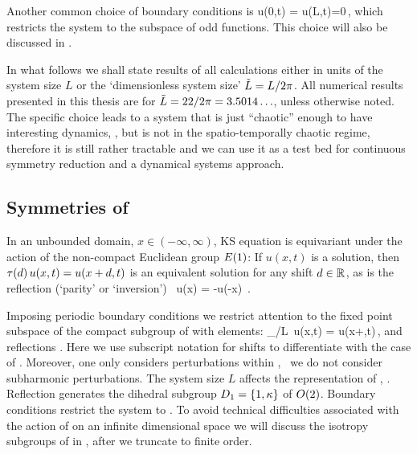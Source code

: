 Another common choice of boundary conditions is
\beq
  u(0,t) = u(L,t)=0\,,
 \label{eq:KSodd}
\eeq
which restricts the system to the subspace of odd functions. This choice will also be discussed
in .

In what follows
we shall state results of all calculations either in units of the system size $L$
or the `dimensionless system size' $\tilde{L}=L/2\pi$.
All numerical results presented in this thesis
are for $\tilde{L}=22/2\pi = 3.5014\ldots$, unless otherwise
noted. The specific choice leads to a system that is just ``chaotic'' enough
to have interesting dynamics, \cf {}, but is not in the spatio-temporally chaotic
regime, therefore it is still rather tractable and we can use it as a test bed for
continuous symmetry reduction and a dynamical systems approach.


\subsection{Symmetries of \KSe}
\label{sec:KSeSymm}

In an unbounded domain, $x\in(-\infty,\infty)$, KS equation is equivariant
under the action of the non-compact Euclidean group $E(1)$:
If $u(x,t)$ is a solution, then
$\tau({d})\, u(x,t) = u(x+d,t)$
is an equivalent solution for any shift
$d\in\mathbb{R}^{}$, as is the reflection (`parity' or `inversion')
\beq
    \Refl \, u(x) = -u(-x)
\,.

Imposing periodic boundary conditions we restrict attention to the fixed
point subspace of the compact subgroup  of  with elements:
\beq
	\Shift_{\shift/L}\, u(x,t) = u(x+\shift,t)\,,\qquad \shift\in\left[-L/2,L/2\right]	
\eeq
and reflections . Here we use subscript
notation for shifts to differentiate with the case of .
Moreover, one only considers perturbations within ,
\ie\ we do not consider subharmonic perturbations. The system
size $L$ affects the representation of , \cf
{}.  Reflection
generates the dihedral subgroup $D_{1} = \{1, \kappa\}$ of
$O(2)$. Boundary conditions  restrict the
system to . To avoid technical difficulties
associated with the action of  on an infinite dimensional
space we will discuss the isotropy subgroups of  in
, after we truncate  to finite
order.



